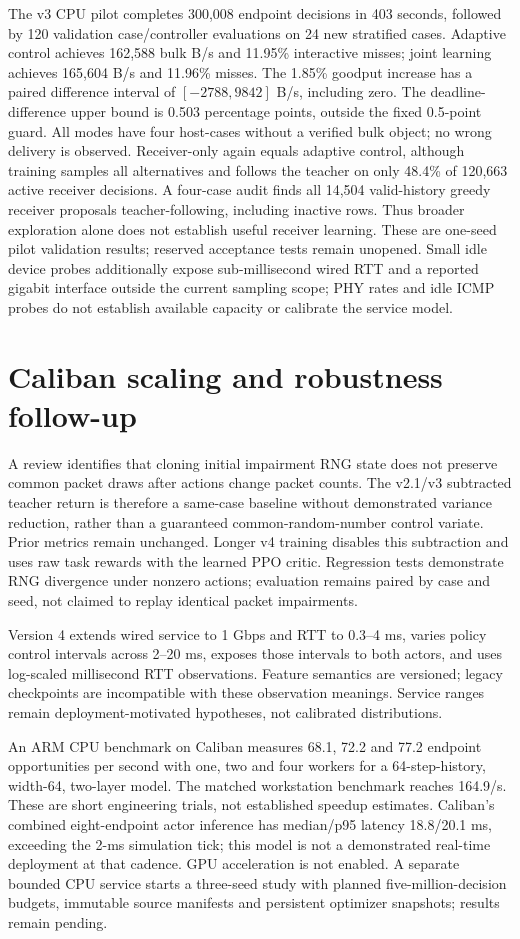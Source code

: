 \documentclass[11pt]{article}
\begin{document}
The v3 CPU pilot completes 300,008 endpoint decisions in 403 seconds, followed
by 120 validation case/controller evaluations on 24 new stratified cases.
Adaptive control achieves 162,588 bulk B/s and 11.95\% interactive misses;
joint learning achieves 165,604 B/s and 11.96\% misses. The 1.85\% goodput
increase has a paired difference interval of $[-2788,9842]$ B/s, including zero.
The deadline-difference upper bound is 0.503 percentage points, outside the fixed
0.5-point guard. All modes have four host-cases without a verified bulk object;
no wrong delivery is observed. Receiver-only again equals adaptive control,
although training samples all alternatives and follows the teacher on only
48.4\% of 120,663 active receiver decisions. A four-case audit finds all 14,504
valid-history greedy receiver proposals teacher-following, including inactive
rows. Thus broader exploration alone does not establish useful receiver learning.
These are one-seed pilot validation results; reserved acceptance tests remain
unopened. Small idle device probes additionally expose sub-millisecond wired
RTT and a reported gigabit interface outside the current sampling scope; PHY
rates and idle ICMP probes do not establish available capacity or calibrate the
service model.

\section{Caliban scaling and robustness follow-up}
A review identifies that cloning initial impairment RNG state does not preserve
common packet draws after actions change packet counts. The v2.1/v3 subtracted
teacher return is therefore a same-case baseline without demonstrated variance
reduction, rather than a guaranteed common-random-number control variate.
Prior metrics remain unchanged. Longer v4 training disables this subtraction and
uses raw task rewards with the learned PPO critic. Regression tests demonstrate
RNG divergence under nonzero actions; evaluation remains paired by case and seed,
not claimed to replay identical packet impairments.

Version 4 extends wired service to 1 Gbps and RTT to 0.3--4 ms, varies policy
control intervals across 2--20 ms, exposes those intervals to both actors, and
uses log-scaled millisecond RTT observations. Feature semantics are versioned;
legacy checkpoints are incompatible with these observation meanings. Service
ranges remain deployment-motivated hypotheses, not calibrated distributions.

An ARM CPU benchmark on Caliban measures 68.1, 72.2 and 77.2 endpoint opportunities
per second with one, two and four workers for a 64-step-history, width-64,
two-layer model. The matched workstation benchmark reaches 164.9/s. These are
short engineering trials, not established speedup estimates. Caliban's combined
eight-endpoint actor inference has median/p95 latency 18.8/20.1 ms, exceeding the
2-ms simulation tick; this model is not a demonstrated real-time deployment at
that cadence. GPU acceleration is not enabled. A separate bounded CPU service
starts a three-seed study with planned five-million-decision budgets, immutable
source manifests and persistent optimizer snapshots; results remain pending.
\end{document}
